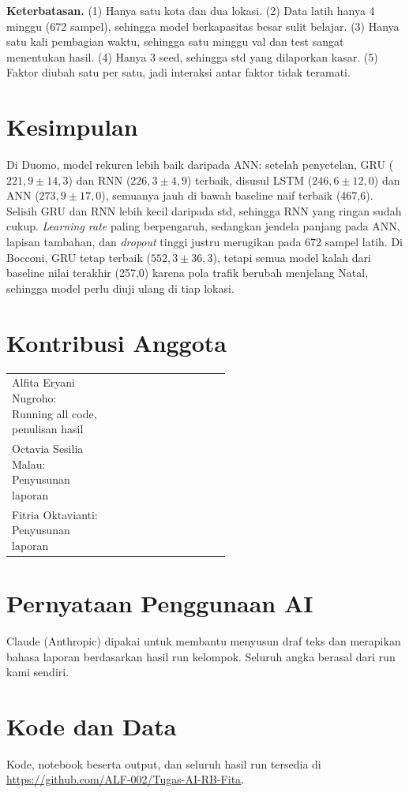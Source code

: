 \documentclass[conference,a4paper]{IEEEtran}
\begin{document}
\textbf{Keterbatasan.} (1) Hanya satu kota dan dua lokasi. (2) Data latih hanya 4 minggu (672 sampel), sehingga model berkapasitas besar sulit belajar. (3) Hanya satu kali pembagian waktu, sehingga satu minggu val dan test sangat menentukan hasil. (4) Hanya 3 seed, sehingga std yang dilaporkan kasar. (5) Faktor diubah satu per satu, jadi interaksi antar faktor tidak teramati.
 
\section{Kesimpulan}
Di Duomo, model rekuren lebih baik daripada ANN: setelah penyetelan, GRU ($221{,}9 \pm 14{,}3$) dan RNN ($226{,}3 \pm 4{,}9$) terbaik, disusul LSTM ($246{,}6 \pm 12{,}0$) dan ANN ($273{,}9 \pm 17{,}0$), semuanya jauh di bawah baseline naif terbaik (467,6). Selisih GRU dan RNN lebih kecil daripada std, sehingga RNN yang ringan sudah cukup. \textit{Learning rate} paling berpengaruh, sedangkan jendela panjang pada ANN, lapisan tambahan, dan \textit{dropout} tinggi justru merugikan pada 672 sampel latih. Di Bocconi, GRU tetap terbaik ($552{,}3 \pm 36{,}3$), tetapi semua model kalah dari baseline nilai terakhir (257,0) karena pola trafik berubah menjelang Natal, sehingga model perlu diuji ulang di tiap lokasi.
 
\section*{Kontribusi Anggota}
\begin{tabular}{@{}lp{0.55\linewidth}@{}}
  Alfita Eryani Nugroho: Running all code, penulisan hasil\\
  Octavia Sesilia Malau: Penyusunan laporan\\
  Fitria Oktavianti: Penyusunan laporan
\end{tabular}
 
\section*{Pernyataan Penggunaan AI}
Claude (Anthropic) dipakai untuk membantu menyusun draf teks dan merapikan bahasa laporan berdasarkan hasil run kelompok. Seluruh angka berasal dari run kami sendiri.
 
\section*{Kode dan Data}
Kode, notebook beserta output, dan seluruh hasil run tersedia di \url{https://github.com/ALF-002/Tugas-AI-RB-Fita}.
 


 
\end{document}
